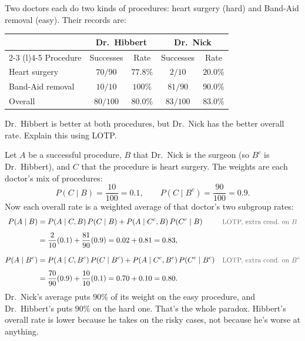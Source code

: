 \begin{example}\label{ex:hibbert}
Two doctors each do two kinds of procedures: heart surgery (hard) and Band-Aid removal (easy). Their records are:
\begin{center}
\begin{tabular}{@{}lcccc@{}}
\toprule
 & \multicolumn{2}{c}{\textbf{Dr.\ Hibbert}} & \multicolumn{2}{c}{\textbf{Dr.\ Nick}} \\
\cmidrule(lr){2-3} \cmidrule(l){4-5}
Procedure & Successes & Rate & Successes & Rate \\
\midrule
Heart surgery     & $70/90$   & $77.8\%$ & $2/10$    & $20.0\%$ \\
Band-Aid removal  & $10/10$   & $100\%$  & $81/90$   & $90.0\%$ \\
\midrule
Overall           & $80/100$  & $80.0\%$ & $83/100$  & $83.0\%$ \\
\bottomrule
\end{tabular}
\end{center}
Dr.\ Hibbert is better at both procedures, but Dr.\ Nick has the better overall rate. Explain this using LOTP.
\end{example}
\begin{solution}
Let $A$ be a successful procedure, $B$ that Dr.\ Nick is the surgeon (so $B^c$ is Dr.\ Hibbert), and $C$ that the procedure is heart surgery. The weights are each doctor's mix of procedures:
\[
P(C \mid B) = \frac{10}{100} = 0.1,
\qquad
P(C \mid B^c) = \frac{90}{100} = 0.9.
\]
Now each overall rate is a weighted average of that doctor's two subgroup rates:
\begin{align*}
P(A \mid B)
  &= P(A \mid C, B)\,P(C \mid B) + P(A \mid C^c, B)\,P(C^c \mid B)
  && \by{LOTP, extra cond.\ on $B$} \\[0.4em]
  &= \frac{2}{10}(0.1) + \frac{81}{90}(0.9)
   = 0.02 + 0.81
   = 0.83, \\[0.8em]
P(A \mid B^c)
  &= P(A \mid C, B^c)\,P(C \mid B^c) + P(A \mid C^c, B^c)\,P(C^c \mid B^c)
  && \by{LOTP, extra cond.\ on $B^c$} \\[0.4em]
  &= \frac{70}{90}(0.9) + \frac{10}{10}(0.1)
   = 0.70 + 0.10
   = 0.80.
\end{align*}
Dr.\ Nick's average puts $90\%$ of its weight on the easy procedure, and Dr.\ Hibbert's puts $90\%$ on the hard one. That's the whole paradox. Hibbert's overall rate is lower because he takes on the risky cases, not because he's worse at anything.
\end{solution}

